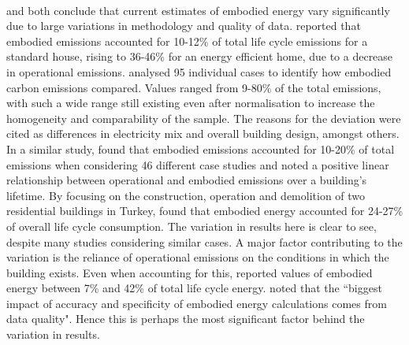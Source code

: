 \documentclass[12pt]{article}
\begin{document}
\paragraph{} \citet{Hamilton-MacLaren2009-pt} and \citet{Moncaster2012-xm} both conclude that current estimates of embodied energy vary significantly due to large variations in methodology and quality of data. \citet{Koezjakov2018-qw} reported that embodied emissions accounted for 10-12\% of total life cycle emissions for a standard house, rising to 36-46\% for an energy efficient home, due to a decrease in operational emissions. \citet{Chastas2018-zl} analysed 95 individual cases to identify how embodied carbon emissions compared. Values ranged from 9-80\% of the total emissions, with such a wide range still existing even after normalisation to increase the homogeneity and comparability of the sample. The reasons for the deviation were cited as differences in electricity mix and overall building design, amongst others. In a similar study, \citet{Ramesh2010-wc} found that embodied emissions accounted for 10-20\% of total emissions when considering 46 different case studies and noted a positive linear relationship between operational and embodied emissions over a building's lifetime. By focusing on the construction, operation and demolition of two residential buildings in Turkey, \citet{Atmaca2015-dq} found that embodied energy accounted for 24-27\% of overall life cycle consumption. The variation in results here is clear to see, despite many studies considering similar cases. A major factor contributing to the variation is the reliance of operational emissions on the conditions in which the building exists. Even when accounting for this, \citet{Karimpour2014-oj} reported values of embodied energy between 7\% and 42\% of total life cycle energy. \citet{Dixit2019-bj} noted that the ``biggest impact of accuracy and specificity of embodied energy calculations comes from data quality". Hence this is perhaps the most significant factor behind the variation in results. 
\end{document}
